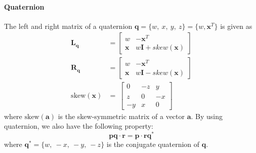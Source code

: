 \documentclass[a4paper]{report}
\begin{document}
\paragraph{Quaternion} 
The left and right matrix of a quaternion $\mathbf{q}=\{w,\ x,\ y,\ z\}=\{w, \mathbf{x}^T\}$ is given as
\begin{align*}
	\mathbf{L_{q}}&=\left[
	\begin{matrix}
	w & -\mathbf{x}^T \\
	\mathbf{x} & w\mathbf{I}+skew(\mathbf{x})
	\end{matrix}
	\right] \\
	\mathbf{R_{q}}&=\left[
	\begin{matrix}
	w & -\mathbf{x}^T \\
	\mathbf{x} & w\mathbf{I}-skew(\mathbf{x})
	\end{matrix}
	\right] \\
	\text{skew}(\mathbf{x})&=\
	\left[
	\begin{matrix}
	0 & -z & y \\
	z & 0 & -x \\
	-y & x & 0
	\end{matrix}
	\right]
\end{align*}
where $\text{skew}(\mathbf{a})$ is the skew-symmetric matrix of a vector $\mathbf{a}$. 
By using quaternion, we also have the following property:
$$
\mathbf{pq}\cdot \mathbf{r} = \mathbf{p} \cdot \mathbf{rq^*}
$$
where $\mathbf{q^*}=\{w,\ -x,\ -y,\ -z\}$ is the conjugate quaternion of $\mathbf{q}$.
\end{document}
